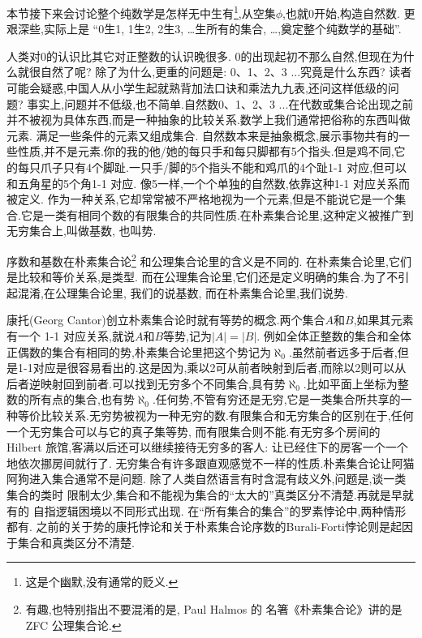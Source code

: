  {\small
 本节接下来会讨论整个纯数学是怎样无中生有\footnote{这是个幽默,没有通常的贬义.},从空集$\phi$,也就0开始,构造自然数.
更艰深些,实际上是 “0生1, 1生2, 2生3, \dots 生所有的集合, \dots,奠定整个纯数学的基础”.

人类对0的认识比其它对正整数的认识晚很多. 0的出现起初不那么自然,但现在为什么就很自然了呢?
除了为什么,更重的问题是: 0、1、2、3 ...究竟是什么东西?
读者可能会疑惑,中国人从小学生起就熟背加法口诀和乘法九九表,还问这样低级的问题?
事实上,问题并不低级,也不简单.自然数0、1、2、3 ...在代数或集合论出现之前并不被视为具体东西,而是一种抽象的比较关系.数学上我们通常把俗称的东西叫做元素.
满足一些条件的元素又组成集合.
自然数本来是抽象概念,展示事物共有的一些性质,并不是元素.你的我的他/她的每只手和每只脚都有5个指头.但是鸡不同,它的每只爪子只有4个脚趾.一只手/脚的5个指头不能和鸡爪的4个趾1-1 对应,但可以和五角星的5个角1-1 对应.
像5一样,一个个单独的自然数,依靠这种1-1 对应关系而被定义.
作为一种关系,它却常常被不严格地视为一个元素,但是不能说它是一个集合.它是一类有相同个数的有限集合的共同性质.在朴素集合论里,这种定义被推广到无穷集合上,叫做基数, 也叫势.

序数和基数在朴素集合论\footnote{有趣,也特别指出不要混淆的是, Paul Halmos 的
名箸《朴素集合论》\cite{HalmosP}讲的是ZFC 公理集合论.}
和公理集合论里的含义是不同的. 
在朴素集合论里,它们是比较和等价关系,是类型.
而在公理集合论里,它们还是定义明确的集合.为了不引起混淆,在公理集合论里,
我们的说基数,
而在朴素集合论里,我们说势.

康托(Georg Cantor)创立朴素集合论时就有等势的概念.两个集合$A$和$B$,如果其元素有一个 1-1 对应关系,就说$A$和$B$等势,记为$|A|=|B|$.
例如全体正整数的集合和全体正偶数的集合有相同的势,朴素集合论里把这个势记为$\aleph_0$.虽然前者远多于后者,但是1-1对应是很容易看出的.这是因为,乘以2可从前者映射到后者,而除以2则可以从后者逆映射回到前者.可以找到无穷多个不同集合,具有势$\aleph_0$.比如平面上坐标为整数的所有点的集合,也有势$\aleph_0$.任何势,不管有穷还是无穷,它是一类集合所共享的一种等价比较关系.无穷势被视为一种无穷的数.有限集合和无穷集合的区别在于,任何一个无穷集合可以与它的真子集等势, 而有限集合则不能.有无穷多个房间的Hilbert 旅馆,客满以后还可以继续接待无穷多的客人: 让已经住下的房客一个一个地依次挪房间就行了.
无穷集合有许多跟直观感觉不一样的性质.朴素集合论让阿猫阿狗进入集合通常不是问题.
除了人类自然语言有时含混有歧义外,问题是,谈一类集合的类时
限制太少,集合和不能视为集合的“太大的”真类区分不清楚.再就是早就有的
自指逻辑困境以不同形式出现.
在“所有集合的集合”的罗素悖论中,两种情形都有.
之前的关于势的康托悖论和关于朴素集合论序数的Burali-Forti悖论则是起因于集合和真类区分不清楚.

}
